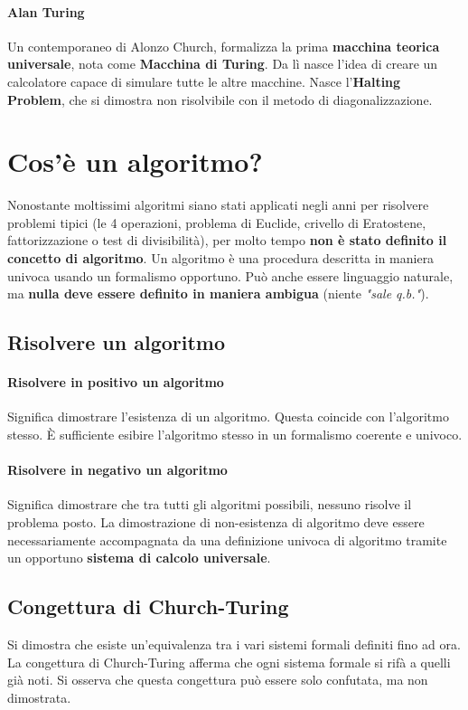	\paragraph{Alan Turing} Un contemporaneo di Alonzo Church, formalizza la prima \textbf{macchina teorica universale}, nota come \textbf{Macchina di Turing}. Da lì nasce l'idea di creare un calcolatore capace di simulare tutte le altre macchine. Nasce l'\textbf{Halting Problem}, che si dimostra non risolvibile con il metodo di diagonalizzazione.
	
	\section{Cos'è un algoritmo?}
	Nonostante moltissimi algoritmi siano stati applicati negli anni per risolvere problemi tipici (le 4 operazioni, problema di Euclide, crivello di Eratostene, fattorizzazione o test di divisibilità), per molto tempo \textbf{non è stato definito il concetto di algoritmo}. Un algoritmo è una procedura descritta in maniera univoca usando un formalismo opportuno. Può anche essere linguaggio naturale, ma \textbf{nulla deve essere definito in maniera ambigua} (niente \textit{"sale q.b."}).
	
	\subsection{Risolvere un algoritmo}
	
	\paragraph{Risolvere in positivo un algoritmo}
	Significa dimostrare l'esistenza di un algoritmo. Questa coincide con l'algoritmo stesso. È sufficiente esibire l'algoritmo stesso in un formalismo coerente e univoco.
	
	\paragraph{Risolvere in negativo un algoritmo}
	Significa dimostrare che tra tutti gli algoritmi possibili, nessuno risolve il problema posto.
	La dimostrazione di non-esistenza di algoritmo deve essere necessariamente accompagnata da una definizione univoca di algoritmo tramite un opportuno \textbf{sistema di calcolo universale}. 
	
	\subsection{Congettura di Church-Turing}
	Si dimostra che esiste un'equivalenza tra i vari sistemi formali definiti fino ad ora. La congettura di Church-Turing afferma che ogni sistema formale si rifà a quelli già noti. Si osserva che questa congettura può essere solo confutata, ma non dimostrata.
	